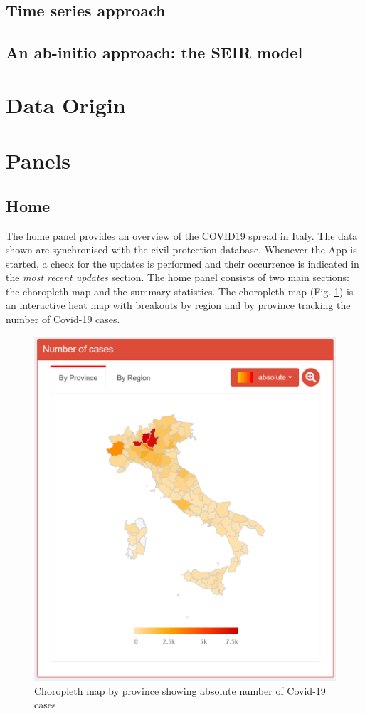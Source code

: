 \documentclass[
12pt, %
a4paper, %
oneside, %
headinclude,footinclude, %
BCOR5mm, %
]{scrartcl}
\begin{document}
\subsection{Time series approach}

\subsection{An ab-initio approach: the SEIR model}


\section{Data Origin} \label{Data Origin}




\clearpage

\section{Panels} \label{Panels}

\subsection{Home}

The home panel provides an overview of the COVID19 spread in Italy. The data shown are synchronised with the civil protection database. Whenever the App is started, a check for the updates is performed and their occurrence is indicated in the \textit{most recent updates }section. The home panel consists of two main sections: the choropleth map and the summary statistics. The choropleth map (Fig. \ref{Home_fig1}) is an interactive heat map with breakouts by region and by province tracking the number of Covid-19 cases. 

\begin{figure}[h]
 \centering
 \includegraphics[width=0.5\linewidth]{Figures/Home_figure_1.png} 
 \caption{Choropleth map by province showing absolute number of Covid-19 cases}
 \label{Home_fig1}
\end{figure}
\end{document}
